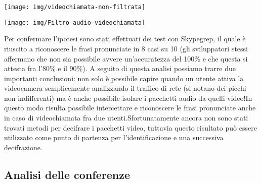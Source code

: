 \begin{center}

\begin{minipage}{\linewidth}
\texttt{[image: img/videochiamata-non-filtrata]}
\end{minipage}

\begin{minipage}{\linewidth}
\texttt{[image: img/Filtro-audio-videochiamata]}
\end{minipage}
\end{center}

Per confermare l'ipotesi sono stati effettuati dei test con Skypegrep, il quale è riuscito a riconoscere le frasi pronunciate in 8 casi su 10 (gli sviluppatori stessi affermano che non sia possibile avvere un'accuratezza del 100\% e che questa si attesta fra l'80\% e il 90\%).\newline\newline
A seguito di questa analisi possiamo trarre due importanti conclusioni: non solo è possibile capire quando un utente attiva la videocamera semplicemente analizzando il traffico di rete (si notano dei picchi non indifferenti) ma è anche possibile isolare i pacchetti audio da quelli video!\newline In questo modo risulta possibile intercettare e riconoscere le frasi pronunciate anche in caso di videochiamata fra due utenti.\newline Sfortunatamente ancora non sono stati trovati metodi per decifrare i pacchetti video, tuttavia questo risultato può essere utilizzato come punto di partenza per l'identificazione e una successiva decifrazione.

\subsection{Analisi delle conferenze}

